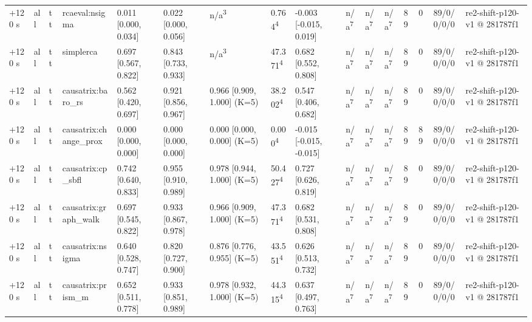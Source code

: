 \begin{table}[t]
\begin{tabular}{llllllllllllllll}
+120 s & all & tt & rcaeval:nsigma & 0.011 [0.000, 0.034] & 0.022 [0.000, 0.056] & n/a\textsuperscript{3} & 0.764\textsuperscript{4} & -0.003 [-0.015, 0.019] & n/a\textsuperscript{7} & n/a\textsuperscript{7} & n/a\textsuperscript{7} & 89 & 0 & 89/0/0/0/0 & re2-shift-p120-v1 @ 281787f1 \\
+120 s & all & tt & simplerca & 0.697 [0.567, 0.822] & 0.843 [0.733, 0.933] & n/a\textsuperscript{3} & 47.371\textsuperscript{4} & 0.682 [0.552, 0.808] & n/a\textsuperscript{7} & n/a\textsuperscript{7} & n/a\textsuperscript{7} & 89 & 0 & 89/0/0/0/0 & re2-shift-p120-v1 @ 281787f1 \\
+120 s & all & tt & causatrix:baro\_rs & 0.562 [0.420, 0.697] & 0.921 [0.856, 0.967] & 0.966 [0.909, 1.000] (K=5) & 38.202\textsuperscript{4} & 0.547 [0.406, 0.682] & n/a\textsuperscript{7} & n/a\textsuperscript{7} & n/a\textsuperscript{7} & 89 & 0 & 89/0/0/0/0 & re2-shift-p120-v1 @ 281787f1 \\
+120 s & all & tt & causatrix:change\_prox & 0.000 [0.000, 0.000] & 0.000 [0.000, 0.000] & 0.000 [0.000, 0.000] (K=5) & 0.000\textsuperscript{4} & -0.015 [-0.015, -0.015] & n/a\textsuperscript{7} & n/a\textsuperscript{7} & n/a\textsuperscript{7} & 89 & 89 & 89/0/0/0/0 & re2-shift-p120-v1 @ 281787f1 \\
+120 s & all & tt & causatrix:cp\_sbfl & 0.742 [0.640, 0.833] & 0.955 [0.910, 0.989] & 0.978 [0.944, 1.000] (K=5) & 50.427\textsuperscript{4} & 0.727 [0.626, 0.819] & n/a\textsuperscript{7} & n/a\textsuperscript{7} & n/a\textsuperscript{7} & 89 & 0 & 89/0/0/0/0 & re2-shift-p120-v1 @ 281787f1 \\
+120 s & all & tt & causatrix:graph\_walk & 0.697 [0.545, 0.822] & 0.933 [0.867, 0.978] & 0.966 [0.909, 1.000] (K=5) & 47.371\textsuperscript{4} & 0.682 [0.531, 0.808] & n/a\textsuperscript{7} & n/a\textsuperscript{7} & n/a\textsuperscript{7} & 89 & 0 & 89/0/0/0/0 & re2-shift-p120-v1 @ 281787f1 \\
+120 s & all & tt & causatrix:nsigma & 0.640 [0.528, 0.747] & 0.820 [0.727, 0.900] & 0.876 [0.776, 0.955] (K=5) & 43.551\textsuperscript{4} & 0.626 [0.513, 0.732] & n/a\textsuperscript{7} & n/a\textsuperscript{7} & n/a\textsuperscript{7} & 89 & 0 & 89/0/0/0/0 & re2-shift-p120-v1 @ 281787f1 \\
+120 s & all & tt & causatrix:prism\_m & 0.652 [0.511, 0.778] & 0.933 [0.851, 0.989] & 0.978 [0.932, 1.000] (K=5) & 44.315\textsuperscript{4} & 0.637 [0.497, 0.763] & n/a\textsuperscript{7} & n/a\textsuperscript{7} & n/a\textsuperscript{7} & 89 & 0 & 89/0/0/0/0 & re2-shift-p120-v1 @ 281787f1 \\

\end{tabular}
\end{table}
